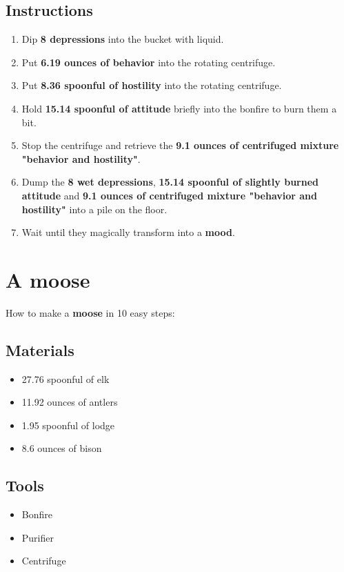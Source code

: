 \documentclass{article}
\begin{document}
\subsection{Instructions}\begin{enumerate}
\item 
Dip \textbf{8 depressions} into the bucket with liquid.
\item 
Put \textbf{6.19 ounces of behavior} into the rotating centrifuge.
\item 
Put \textbf{8.36 spoonful of hostility} into the rotating centrifuge.
\item 
Hold \textbf{15.14 spoonful of attitude} briefly into the bonfire to burn them a bit.
\item 
Stop the centrifuge and retrieve the \textbf{9.1 ounces of centrifuged mixture "behavior and hostility"}.
\item 
Dump the \textbf{8 wet depressions}, \textbf{15.14 spoonful of slightly burned attitude} and \textbf{9.1 ounces of centrifuged mixture "behavior and hostility"} into a pile on the floor.
\item 
Wait until they magically transform into a \textbf{mood}.
\end{enumerate}
\newpage
\section{A moose}How to make a \textbf{moose} in 10 easy steps:

\subsection{Materials}\begin{itemize}
\item 
27.76 spoonful of elk
\item 
11.92 ounces of antlers
\item 
1.95 spoonful of lodge
\item 
8.6 ounces of bison
\end{itemize}
\subsection{Tools}\begin{itemize}
\item 
Bonfire
\item 
Purifier
\item 
Centrifuge
\end{itemize}
\end{document}
